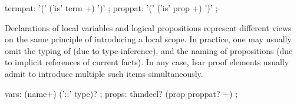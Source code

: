 \begin{isabellebody}
\begin{isamarkuptext}
  \begin{rail}
    termpat: '(' ('is' term +) ')'
    ;
    proppat: '(' ('is' prop +) ')'
    ;
  \end{rail}

  \medskip Declarations of local variables  and
  logical propositions  represent different views on
  the same principle of introducing a local scope.  In practice, one
  may usually omit the typing of  (due to
  type-inference), and the naming of propositions (due to implicit
  references of current facts).  In any case, Isar proof elements
  usually admit to introduce multiple such items simultaneously.

  \begin{rail}
    vars: (name+) ('::' type)?
    ;
    props: thmdecl? (prop proppat? +)
    ;
  \end{rail}


\end{isamarkuptext}
\end{isabellebody}
